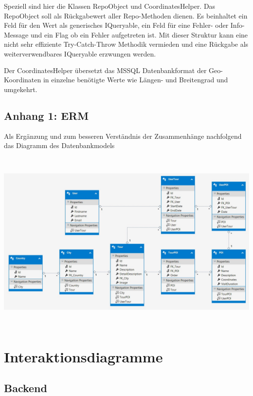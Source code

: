 \documentclass[a4paper,10pt,xetex]{article}
\begin{document}
	Speziell sind hier die Klassen RepoObject und CoordinatesHelper. Das RepoObject soll als R\"uckgabewert aller
	Repo-Methoden dienen. Es beinhaltet ein Feld f\"ur den Wert als generisches IQueryable, ein Feld f\"ur eine Fehler-
	oder Info-Message und ein Flag ob ein Fehler aufgetreten ist. Mit dieser Struktur kann eine nicht sehr effiziente
	Try-Catch-Throw Methodik vermieden und eine R\"uckgabe als weiterverwendbares IQueryable erzwungen werden.


	Der CoordinatesHelper \"ubersetzt das MSSQL Datenbankformat der Geo-Koordinaten in einzelne ben\"otigte Werte wie
	L\"angen- und Breitengrad und umgekehrt.

\subsection[Anhang 1: ERM]{Anhang 1: ERM}

	Als Erg\"anzung und zum besseren Verst\"andnis der Zusammenh\"ange nachfolgend das Diagramm des Datenbankmodels

\includegraphics[width=6.5in,height=3.6091in]{erm.jpg} 

\clearpage
\bigskip

\section{Interaktionsdiagramme}\label{interaktionsdiagramme}
\subsection{Backend}\label{backend}
\end{document}
